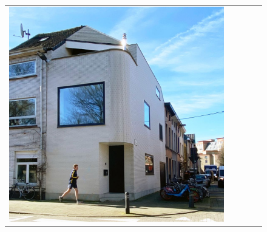 \begin{figure}[H]
{\begin{tabular}{@{}ccccc@{}}
      \includegraphics[width=\linewidth]{Images/LoRAs/Ghoek/Training_images/5.jpg} \\[2pt]


\end{tabular}}
\end{figure}
